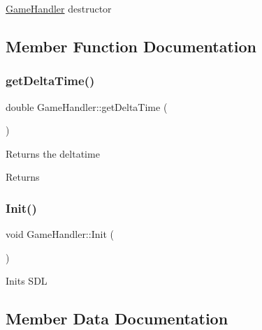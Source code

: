 \mbox{\hyperlink{class_game_handler}{Game\+Handler}} destructor 



\subsection{Member Function Documentation}
\mbox{\label{class_game_handler_aebe798f7fee6c05c05bec6540f240238}} 
\subsubsection{\texorpdfstring{get\+Delta\+Time()}{getDeltaTime()}}
{\footnotesize\ttfamily double Game\+Handler\+::get\+Delta\+Time (\begin{DoxyParamCaption}{ }\end{DoxyParamCaption})\hspace{0.3cm}{\ttfamily [static]}}



Returns the deltatime 

\begin{DoxyReturn}{Returns}

\end{DoxyReturn}
\mbox{\label{class_game_handler_aba984ea50d3ce52070950c5aa24e0d7f}} 
\subsubsection{\texorpdfstring{Init()}{Init()}}
{\footnotesize\ttfamily void Game\+Handler\+::\+Init (\begin{DoxyParamCaption}{ }\end{DoxyParamCaption})}



Inits S\+DL 



\subsection{Member Data Documentation}
\mbox{\label{class_game_handler_a0076f4fe9cad55a986a899bd14b97061}} 
